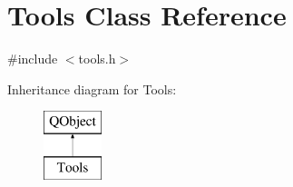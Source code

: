 \hypertarget{class_tools}{}\section{Tools Class Reference}
\label{class_tools}


{\ttfamily \#include $<$tools.\+h$>$}

Inheritance diagram for Tools\+:\begin{figure}[H]
\begin{center}
\leavevmode
\includegraphics[height=2.000000cm]{class_tools}
\end{center}
\end{figure}
